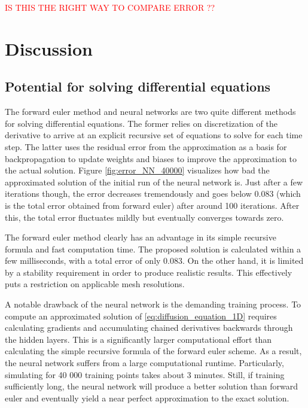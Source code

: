 \documentclass[12pt]{extarticle}
\begin{document}
\textcolor{red}{IS THIS THE RIGHT WAY TO COMPARE ERROR ??}
 

\section{Discussion}
\subsection*{Potential for solving differential equations}
The forward euler method and neural networks are two quite different methods for solving differential equations. The former relies on discretization of the derivative to arrive at an explicit recursive set of equations to solve for each time step. The latter uses the residual error from the approximation as a basis for backpropagation to update weights and biases to improve the approximation to the actual solution. Figure \ref{fig:error_NN_40000} visualizes how bad the approximated solution of the initial run of the neural network is. Just after a few iterations though, the error decreases tremendously and goes below 0.083 (which is the total error obtained from forward euler) after around 100 iterations. After this, the total error fluctuates mildly but eventually converges towards zero.
 
\par The forward euler method clearly has an advantage in its simple recursive formula and fast computation time. The proposed solution is calculated within a few milliseconds, with a total error of only 0.083. On the other hand, it is limited by a stability requirement in order to produce realistic results. This effectively puts a restriction on applicable mesh resolutions.

\par A notable drawback of the neural network is the demanding training process. To compute an approximated solution of \ref{eq:diffusion_equation_1D} requires calculating gradients and accumulating chained derivatives backwards through the hidden layers. This is a significantly larger computational effort than calculating the simple recursive formula of the forward euler scheme. As a result, the neural network suffers from a large computational runtime. Particularly, simulating for 40 000 training points takes about 3 minutes. Still, if training sufficiently long, the neural network will produce a better solution than forward euler and eventually yield a near perfect approximation to the exact solution. 
\end{document}
